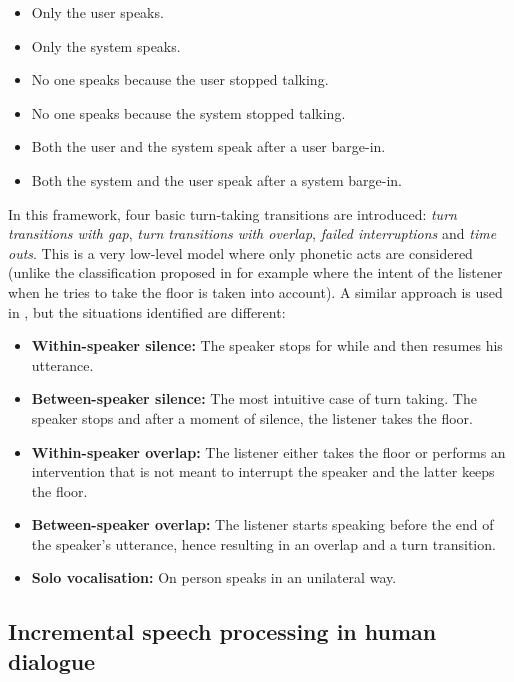         \begin{itemize}
          \item Only the user speaks.
          \item Only the system speaks.
          \item No one speaks because the user stopped talking.
          \item No one speaks because the system stopped talking.
          \item Both the user and the system speak after a user barge-in.
          \item Both the system and the user speak after a system barge-in.
        \end{itemize}
        
        In this framework, four basic turn-taking transitions are introduced: \textit{turn transitions with gap}, \textit{turn transitions with overlap}, \textit{failed interruptions} and \textit{time outs}. This is a very low-level model where only phonetic acts are considered (unlike the classification proposed in \cite{Beattie1982} for example where the intent of the listener when he tries to take the floor is taken into account). A similar approach is used in \cite{Wlodarczak2013}, but the situations identified are different:

        \begin{itemize}
           \item \textbf{Within-speaker silence:} The speaker stops for while and then resumes his utterance.
           \item \textbf{Between-speaker silence:} The most intuitive case of turn taking. The speaker stops and after a moment of silence, the listener takes the floor.
           \item \textbf{Within-speaker overlap:} The listener either takes the floor or performs an intervention that is not meant to interrupt the speaker and the latter keeps the floor.
           \item \textbf{Between-speaker overlap:} The listener starts speaking before the end of the speaker's utterance, hence resulting in an overlap and a turn transition.
           \item \textbf{Solo vocalisation:} On person speaks in an unilateral way.
        \end{itemize}
        
        \subsection{Incremental speech processing in human dialogue}
        \label{soa:inchuman}

